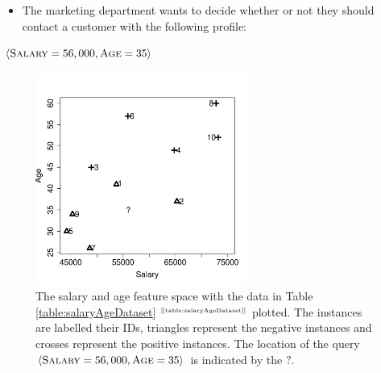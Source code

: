 \documentclass[xcolor={table}]{beamer}
\newcommand{\featN}[1]{\textsc{#1}}
\newcommand{\ourRef}[1]{\ref{#1} $^{\text{\tiny[\pageref{#1}]}}$}
\begin{document}
\begin{frame}
\begin{itemize}
	\item The marketing department wants to decide whether or not they should contact a customer with the following profile: \end{itemize}
\centerline{
$\left<\text{\featN{Salary}}=56,000,\text{\featN{Age}}=35\right>$
}
\end{frame}


 \begin{frame} [plain]
\begin{figure}[htb]
	\begin{center}
	\includegraphics[width=0.62\textwidth]{./images/knn_normalisation_1.pdf}
	\end{center}
	\caption{The salary and age feature space with the data in Table \ourRef{table:salaryAgeDataset} plotted. The instances are labelled their IDs, triangles represent the negative instances and crosses represent the positive instances. The location of the query $\left<\text{\featN{Salary}}=56,000,\text{\featN{Age}}=35\right>$ is indicated by the $?$.} 
	\label{fig:salaryAgePurchase}
\end{figure}
\end{frame} 
\end{document}

